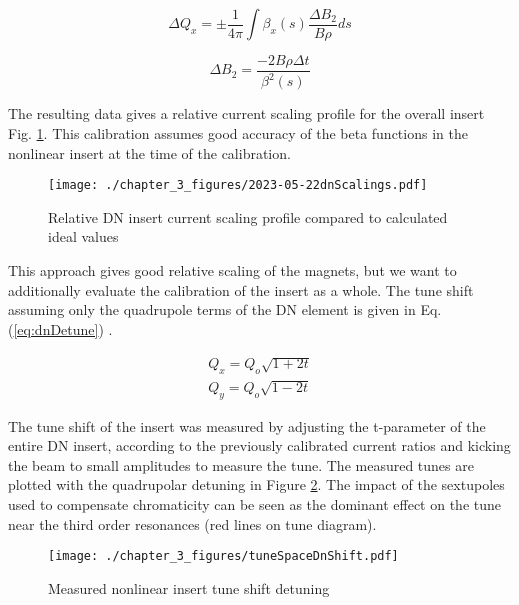 \begin{equation}
    	\Delta Q_{x} = \pm \frac{1}{4\pi}\int{\beta_x(s) \frac{\Delta B_2}{B\rho} ds}
    	\label{eq:quadErrShift}
\end{equation}

\begin{equation}
	\Delta B_2 = \frac{-2B\rho \Delta t}{\beta^2(s)}
	\label{eq:dnQuadTerm}
\end{equation}

The resulting data gives a relative current scaling profile for the overall insert Fig. \ref{fig:dnIscaling}. This calibration assumes good accuracy of the beta functions in the nonlinear insert at the time of the calibration.

\begin{figure}
    \centering
    \texttt{[image: ./chapter\_3\_figures/2023-05-22dnScalings.pdf]}
    \caption{Relative DN insert current scaling profile compared to calculated ideal values}
    \label{fig:dnIscaling}
\end{figure}

This approach gives good relative scaling of the magnets, but we want to additionally evaluate the calibration of the insert as a whole. The tune shift assuming only the quadrupole terms of the DN element is given in Eq. (\ref{eq:dnDetune}) \cite{nagaitsevNonlinearOpticsPath2012}.

\begin{equation}
	\begin{split}
	Q_{x} = Q_{o}\sqrt{1+2t} \\
        Q_{y} = Q_{o}\sqrt{1-2t}
	\end{split}
	\label{eq:dnDetune}
\end{equation}

The tune shift of the insert was measured by adjusting the t-parameter of the entire DN insert, according to the previously calibrated current ratios and kicking the beam to small amplitudes to measure the tune. The measured tunes are plotted with the quadrupolar detuning in Figure \ref{fig:dnDetuning}. The impact of the sextupoles used to compensate chromaticity can be seen as the dominant effect on the tune near the third order resonances (red lines on tune diagram).

\begin{figure}
    \centering
    \texttt{[image: ./chapter\_3\_figures/tuneSpaceDnShift.pdf]}
    \caption{Measured nonlinear insert tune shift detuning}
    \label{fig:dnDetuning}
\end{figure}

